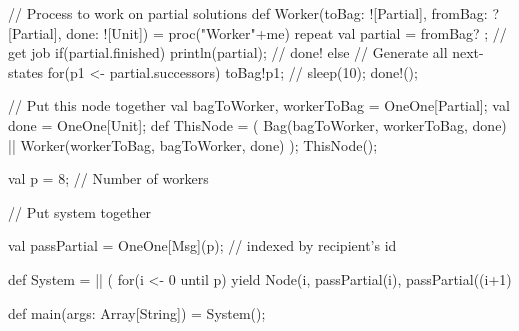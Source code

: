 \begin{answer}
\begin{scala}
{{    // Process to work on partial solutions
    def Worker(toBag: ![Partial], fromBag: ?[Partial], 
               done: ![Unit])
    = proc("Worker"+me){
      repeat{
	val partial = fromBag? ; // get job
	if(partial.finished){ println(partial); } // done!
	else // Generate all next-states
	  for(p1 <- partial.successors) toBag!p1; 
	// sleep(10); 
	done!();
      }
    }

    // Put this node together
    val bagToWorker, workerToBag = OneOne[Partial];
    val done = OneOne[Unit];
    def ThisNode = (
      Bag(bagToWorker, workerToBag, done) || 
      Worker(workerToBag, bagToWorker, done)
    );
    ThisNode();
  }

  val p = 8; // Number of workers

  // Put system together

  val passPartial = OneOne[Msg](p); // indexed by recipient's id

  def System = 
    || ( for(i <- 0 until p) yield 
           Node(i, passPartial(i), passPartial((i+1)%

  def main(args: Array[String]) = System();

}
\end{scala}
\end{answer}
